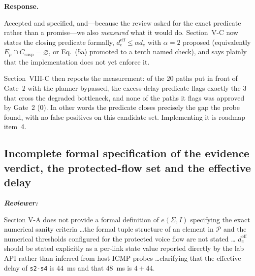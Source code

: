 \documentclass[11pt,a4paper]{article}
\newcommand{\ProbeTotal}{20}
\newcommand{\ProbeStrong}{3}
\newcommand{\ProbeStrongApproved}{0}
\newenvironment{reviewer}{\par\medskip\noindent\begin{minipage}{\linewidth}\small\itshape\color{quote}\textbf{Reviewer:}\par}{\end{minipage}\medskip\par}
\newenvironment{response}{\par\noindent\begin{minipage}{\linewidth}\small\textbf{Response.}\par}{\end{minipage}\medskip\par}
\begin{document}
\begin{response}
Accepted and specified, and---because the review asked for the exact
predicate rather than a promise---we also \emph{measured} what it would
do. Section~V-C now states the closing predicate formally,
$d^{\mathrm{eff}}_e\le\alpha d_e$ with $\alpha=2$ proposed (equivalently
$E_p\cap C_{\mathrm{susp}}=\varnothing$, or Eq.~(5a) promoted to a tenth
named check), and says plainly that the implementation does not yet enforce
it.

Section~VIII-C then reports the measurement: of the $\ProbeTotal$ paths put
in front of Gate~2 with the planner bypassed, the excess-delay predicate
flags exactly the $\ProbeStrong$ that cross the degraded bottleneck, and
none of the paths it flags was approved by Gate~2
($\ProbeStrongApproved$). In other words the predicate closes precisely
the gap the probe found, with no false positives on this candidate set.
Implementing it is roadmap item~4.
\end{response}

\subsection{Incomplete formal specification of the evidence verdict, the
protected-flow set and the effective delay}

\begin{reviewer}
Section V-A does not provide a formal definition of $e(\Sigma, I)$
specifying the exact numerical sanity criteria \dots the formal tuple
structure of an element in $\mathcal{P}$ and the numerical thresholds
configured for the protected voice flow are not stated \dots
$d^{\mathrm{eff}}_e$ should be stated explicitly as a per-link state value
reported directly by the lab API rather than inferred from host ICMP
probes \dots clarifying that the effective delay of \texttt{s2-s4} is
$44$~ms and that $48$~ms is $4+44$.
\end{reviewer}
\end{document}
